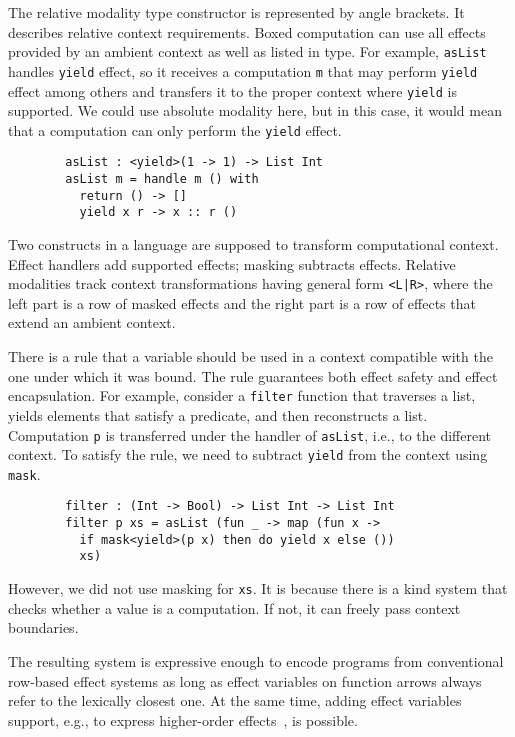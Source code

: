 \documentclass[conference]{IEEEtran}
\begin{document}
    The relative modality type constructor is represented by angle brackets.
    It describes relative context requirements.
    Boxed computation can use all effects provided by an ambient context as well as listed in type.
    For example, \texttt{asList} handles \texttt{yield} effect, so it receives a computation \texttt{m} that may perform \texttt{yield} effect among others and transfers it to the proper context where \texttt{yield} is supported.
    We could use absolute modality here, but in this case, it would mean that a computation can only perform the \texttt{yield} effect.
    \begin{verbatim}
        asList : <yield>(1 -> 1) -> List Int
        asList m = handle m () with
          return () -> []
          yield x r -> x :: r ()
    \end{verbatim}

    Two constructs in a language are supposed to transform computational context.
    Effect handlers add supported effects; masking subtracts effects.
    Relative modalities track context transformations having general form \texttt{<L|R>}, where the left part is a row of masked effects and the right part is a row of effects that extend an ambient context.

    There is a rule that a variable should be used in a context compatible with the one under which it was bound.
    The rule guarantees both effect safety and effect encapsulation.
    For example, consider a \texttt{filter} function that traverses a list, yields elements that satisfy a predicate, and then reconstructs a list.
    Computation \texttt{p} is transferred under the handler of \texttt{asList}, i.e., to the different context.
    To satisfy the rule, we need to subtract \texttt{yield} from the context using \texttt{mask}.
    \begin{verbatim}
        filter : (Int -> Bool) -> List Int -> List Int
        filter p xs = asList (fun _ -> map (fun x ->
          if mask<yield>(p x) then do yield x else ())
          xs)
    \end{verbatim}

    However, we did not use masking for \texttt{xs}.
    It is because there is a kind system that checks whether a value is a computation.
    If not, it can freely pass context boundaries.

    The resulting system is expressive enough to encode programs from conventional row-based effect systems as long as effect variables on function arrows always refer to the lexically closest one.
    At the same time, adding effect variables support, e.g., to express higher-order effects~\cite{wu2014effect}, is possible.
\end{document}
